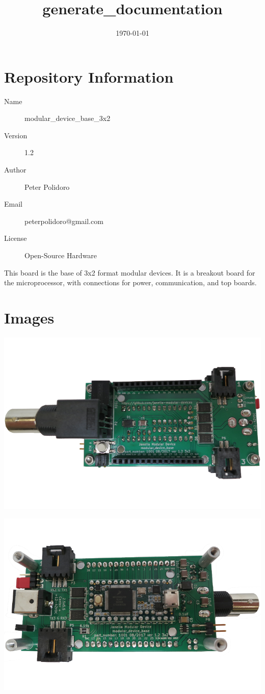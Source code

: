 \documentclass[11pt]{article}
\date{\today}
\title{generate\_documentation}
\begin{document}
\tableofcontents


\section{Repository Information}
\label{sec:org92a99fb}
\begin{description}
\item[{Name}] modular\_device\_base\_3x2
\item[{Version}] 1.2
\item[{Author}] Peter Polidoro
\item[{Email}] peterpolidoro@gmail.com
\item[{License}] Open-Source Hardware
\end{description}

This board is the base of 3x2 format modular devices. It is a breakout board
for the microprocessor, with connections for power, communication, and top
boards.

\section{Images}
\label{sec:org4242158}

\begin{center}
\includegraphics[width=.9\linewidth]{./images/top.png}
\end{center}

\begin{center}
\includegraphics[width=.9\linewidth]{./images/bottom.png}
\end{center}
\end{document}

